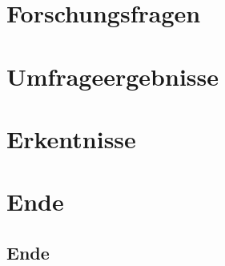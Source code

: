 \documentclass[hyperref={pdfpagelabels=false},usepdftitle=false]{beamer}
\begin{document}

\title{\titleText}
\subtitle{Pretest zur Umfrage \enquote{Textsetzung mathematischer Formeln} von Martin Thoma}
\author{\tutor}
\date{10. Januar 2015}

\frame{\titlepage}



\section{Forschungsfragen}


\section{Umfrageergebnisse}


\section{Erkentnisse}


\section*{Ende}
\subsection{Ende}

\end{document}
